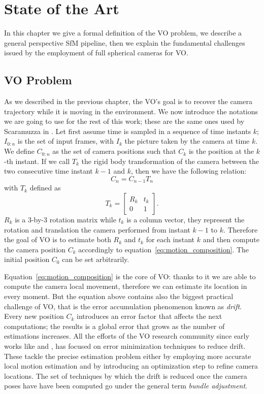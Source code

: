 \chapter{State of the Art}
\label{ch:state_of_the_art}
In this chapter we give a formal definition of the VO problem, we describe a 
general perspective SfM pipeline, then 
we explain the fundamental challenges issued by the employment of full 
spherical cameras for VO.

\section{VO Problem}
\label{sec:vo_problem}
As we described in the previous chapter, the VO's goal is to recover the 
camera trajectory while it is moving in the environment. We now
introduce the notations we are going to use for the rest of this work; 
these are the same ones used by Scaramuzza in \cite{scaramuzzaVisualOdometryI}.
Let first assume time is sampled in a sequence of time instants \(k\); 
\(I_{0:n} \) is the set of input frames, with \(I_{k}\) the picture taken by 
the camera at time
\(k\). We define \(C_{0:n}\) as the set of camera 
positions such that \(C_k\) is the position at the \(k\)-th instant.
If we call \(T_k\) the rigid body transformation of the camera between the two
consecutive time instant $k-1$ and $k$, then we have the following relation:
\begin{equation}
	\label{eq:motion_composition}
C_n = C_{n-1} T_n
\end{equation}
\noindent with \(T_k\) defined as
\begin{equation*}
	T_k =
	\begin{bmatrix}
	R_k & t_k \\
	0 & 1
	\end{bmatrix} \text{.}
\end{equation*}
\noindent $R_k$ is a 3-by-3 rotation matrix while $t_k$ is a column vector, 
they represent the rotation and translation the camera performed from instant 
$k-1$ to $k$.
Therefore the goal of VO is to estimate both $R_k$ and $t_k$ for each instant 
$k$ and then compute the camera position $C_k$ accordingly to 
equation~\ref{eq:motion_composition}.
The initial position $C_0$ can be set arbitrarily.

Equation~\ref{eq:motion_composition} is the core of VO: thanks to it we are able
to compute the camera local movement, therefore we can estimate its location in 
every moment. But the equation above contains also the biggest practical 
challenge of VO, that is the error accumulation phenomenon known as 
\textit{drift}.
Every new position $C_k$ introduces an error factor that affects the next 
computations; the results is a global error that grows as the number of 
estimations increases.
All the efforts of the VO research community since early works like 
\cite{harris19883d} and \cite{moravec1980obstacle}, has focused on error
minimization techniques to reduce drift.
These tackle the precise estimation problem either by employing more accurate
local motion estimation and by introducing an optimization step to refine 
camera locations.
The set of techniques by which the drift is reduced once the camera poses have 
have been computed go under the general term \textit{bundle adjustment}.

